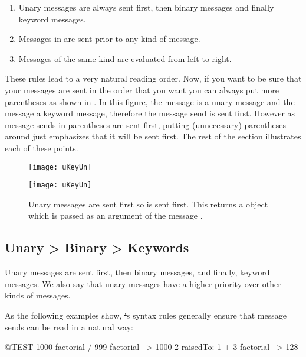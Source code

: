 \documentclass[a4paper,10pt,twoside]{book}
\begin{document}
\begin{enumerate}
\item Unary messages are always sent first, then binary messages and finally keyword messages. 
\item Messages in  are sent prior to any kind of message. 
\item Messages of the same kind are evaluated from left to right. 
\end{enumerate}

These rules lead to a very natural reading order.
Now, if you want to be sure that your messages are sent in the order that you want you can always put more parentheses as shown in .
In this figure, the message  is a unary message and the message  a keyword message, therefore the message send  is sent first.
However as message sends in parentheses are sent first, putting (unnecessary) parentheses around  just emphasizes that it will be sent first.
The rest of the section illustrates each of these points.

\begin{figure}[ht]
\ifluluelse
	{\centerline{\texttt{[image: uKeyUn]}} }
	{\centerline{\texttt{[image: uKeyUn]}} }
\caption{Unary messages are sent first so  is sent first.
	This returns a  object which is passed as an argument of the message .\label{fig:uKeyUn}}
\end{figure}

\subsection*{Unary > Binary > Keywords}
Unary messages are sent first, then binary messages, and finally, keyword messages.
We also say that unary messages have a higher priority over other kinds of messages.


As the following examples show, \st's syntax rules generally ensure that message sends can be read in a natural way:
\begin{code}{@TEST}
1000 factorial / 999 factorial --> 1000
2 raisedTo: 1 + 3 factorial     --> 128
\end{code}
\noindent
\end{document}
